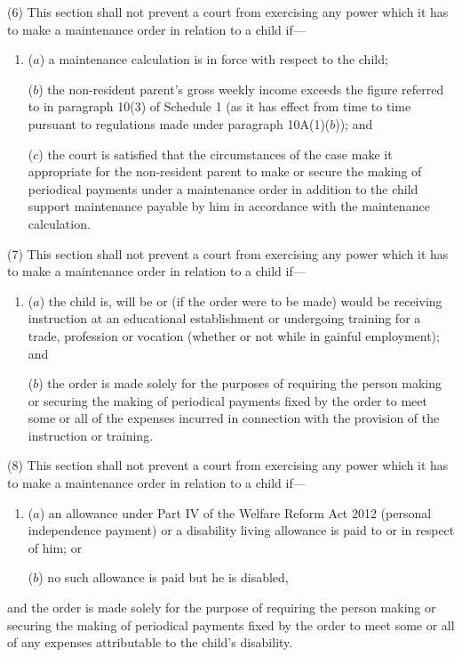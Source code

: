 \documentclass[12pt,a4paper]{article}
\begin{document}
(6)
This section shall not prevent a court from exercising any power which it
has to make a maintenance order in relation to a child if---
\begin{enumerate}\item[]
($a$)
a maintenance calculation
is in force with respect
to the child;

($b$) the non-resident parent’s gross weekly income exceeds the figure
referred to in paragraph 10(3) of Schedule 1 (as it has effect from time to
time pursuant to regulations made under paragraph 10A(1)($b$)); and

($c$)
the court is satisfied that the circumstances of the case make it appropriate for the non-resident parent
to make or secure the making
of periodical payments under a maintenance order in addition to the child
support maintenance payable by him in accordance with the maintenance calculation.
\end{enumerate}

(7)
This section shall not prevent a court from exercising any power which it
has to make a maintenance order in relation to a child if---
\begin{enumerate}\item[]
($a$)
the child is, will be or (if the order were to be made) would be receiving
instruction at an educational establishment or undergoing training for a
trade, profession or vocation (whether or not while in gainful employment); and

($b$)
the order is made solely for the purposes of requiring the person making
or securing the making of periodical payments fixed by the order to meet
some or all of the expenses incurred in connection with the provision of
the instruction or training.
\end{enumerate}

(8)
This section shall not prevent a court from exercising any power which it
has to make a maintenance order in relation to a child if---
\begin{enumerate}\item[]
($a$) an allowance under Part IV of the Welfare Reform Act 2012 (personal independence payment) or
a disability living allowance is paid to or in respect of him; or

($b$)
no such allowance is paid but he is disabled,
\end{enumerate}
and the order is made solely for the purpose of requiring the person making or
securing the making of periodical payments fixed by the order to meet some or all
of any expenses attributable to the child’s disability.
\end{document}
